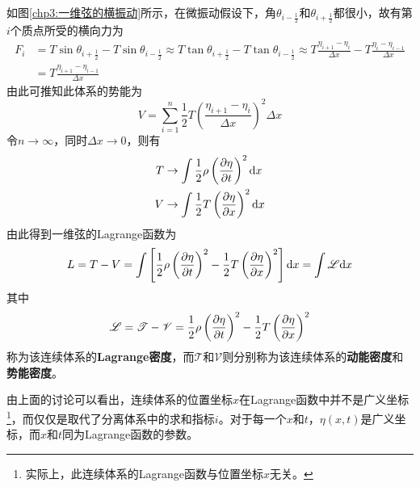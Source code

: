 如图\ref{chp3:一维弦的横振动}所示，在微振动假设下，角$\theta_{i-\frac12}$和$\theta_{i+\frac12}$都很小，故有第$i$个质点所受的横向力为
\begin{align}
	F_i & = T\sin \theta_{i+\frac12} - T\sin \theta_{i-\frac12} \approx T\tan \theta_{i+\frac12} - T\tan \theta_{i-\frac12} \approx T \frac{\eta_{i+1}-\eta_i}{\Delta x} - T \frac{\eta_i-\eta_{i-1}}{\Delta x} \nonumber \\
	& = T\frac{\eta_{i+1}-\eta_{i-1}}{\Delta x}
	\label{连续体系的Lagrange方程-2}
\end{align}
由此可推知此体系的势能为
\begin{equation}
	V = \sum_{i=1}^n \frac12 T\left(\frac{\eta_{i+1}-\eta_i}{\Delta x}\right)^2 \Delta x
	\label{连续体系的Lagrange方程-3}
\end{equation}
令$n \to \infty$，同时$\Delta x\to 0$，则有
\begin{align}
	T & \to \int \frac12 \rho \left(\frac{\partial \eta}{\partial t}\right)^2 \mathrm{d}x \label{连续体系的Lagrange方程-4} \\
	V & \to \int \frac12 T\left(\frac{\partial \eta}{\partial x}\right)^2 \mathrm{d}x \label{连续体系的Lagrange方程-5}
\end{align}
由此得到一维弦的Lagrange函数为
\begin{equation}
	L = T-V = \int \left[\frac12 \rho \left(\frac{\partial \eta}{\partial t}\right)^2 - \frac12 T\left(\frac{\partial \eta}{\partial x}\right)^2\right] \mathrm{d}x = \int \mathscr{L} \mathrm{d}x
	\label{连续体系的Lagrange方程-5}
\end{equation}
其中
\begin{equation}
	\mathscr{L} = \mathscr{T} - \mathscr{V} = \frac12 \rho \left(\frac{\partial \eta}{\partial t}\right)^2 - \frac12 T \left(\frac{\partial \eta}{\partial x}\right)^2 
	\label{连续体系的Lagrange方程-6}
\end{equation}
称为该连续体系的{\bf Lagrange密度}，而$\mathscr{T}$和$\mathscr{V}$则分别称为该连续体系的{\bf 动能密度}和{\bf 势能密度}。

由上面的讨论可以看出，连续体系的位置坐标$x$在Lagrange函数中并不是广义坐标\footnote{实际上，此连续体系的Lagrange函数与位置坐标$x$无关。}，而仅仅是取代了分离体系中的求和指标$i$。对于每一个$x$和$t$，$\eta(x,t)$是广义坐标，而$x$和$t$同为Lagrange函数的参数。

